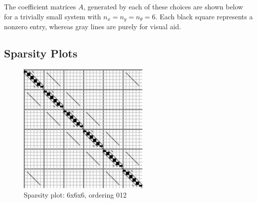 \documentclass[10pt]{article}
\begin{document}
\begin{multicols}{2}
The coefficient matrices $A$, generated by each of these choices are shown below for a trivially small system with $n_x=n_y=n_\theta=6$.
Each black square represents a nonzero entry, whereas gray lines are purely for visual aid.

\pagebreak

\subsection{Sparsity Plots}

\newcommand{\spwidth}{2.5in}
\newcommand{\spmgin}{.1in}

\begin{center}
\noindent
\begin{minipage}[t]{.5\textwidth}%
\begin{figure}[H]
    \centering
    \includegraphics[width=\spwidth]{../img/sparsity/int_small_6x6x6_012.eps}
    \caption{Sparsity plot: 6x6x6, ordering 012 }
\end{figure}
\vspace{\spmgin}
\begin{figure}[H]
    \centering

\end{figure}
\end{minipage}
\end{center}
\end{multicols}
\end{document}
